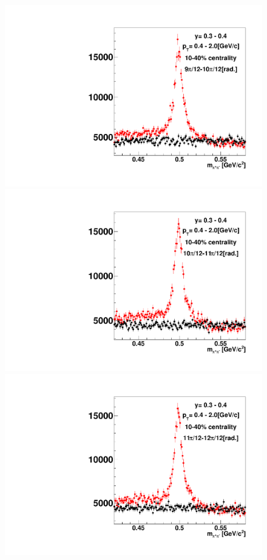 \begin{figure}[h]
\includegraphics[width=0.14\linewidth]{chapterX/fig/ks_v1_sig/kf_ptslice0_cent1_ks_flow_phi10_rap1_check.pdf}
\includegraphics[width=0.14\linewidth]{chapterX/fig/ks_v1_sig/kf_ptslice0_cent1_ks_flow_phi11_rap1_check.pdf}
\includegraphics[width=0.14\linewidth]{chapterX/fig/ks_v1_sig/kf_ptslice0_cent1_ks_flow_phi12_rap1_check.pdf}


\end{figure}
